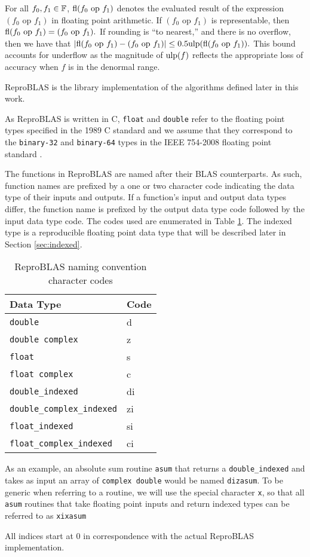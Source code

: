   For all $f_0, f_1 \in \mathbb{F}$, $\text{fl}(f_0 \text{ op } f_1)$ denotes the evaluated
  result of the expression $(f_0 \text{ op } f_1)$ in floating point
  arithmetic. If $(f_0 \text{ op } f_1)$ is representable, then
  \(
    \text{fl}(f_0 \text{ op } f_1) = (f_0 \text{ op } f_1).
  \)
  If rounding is ``to nearest,'' and there is no overflow, then we have that
  \(
    |\text{fl}(f_0 \text{ op } f_1) - (f_0 \text{ op } f_1)| \leq 0.5\text{ulp}(\text{fl}(f_0 \text{ op } f_1)).
  \)
  This bound accounts for underflow as the magnitude of $\text{ulp}(f)$ reflects the appropriate loss of accuracy when $f$ is in the denormal range.

  ReproBLAS is the library implementation of the algorithms defined later in this work.

  As ReproBLAS is written in C, \texttt{float} and \texttt{double} refer to the
  floating point types specified in the 1989 C standard \cite{c89} and we
  assume that they correspond to the \texttt{binary-32} and \texttt{binary-64}
  types in the IEEE 754-2008 floating point standard \cite{ieee754}.

  The functions in ReproBLAS are named after their BLAS counterparts.
  As such, function names are prefixed by a one or two character code indicating the data type of their inputs and outputs. If a function's input and output data types differ, the function name is prefixed by the output data type code followed by the input data type code.
  The codes used are enumerated in Table \ref{tbl:blas_naming_codes}. The indexed type is a reproducible floating point data type that will be described later in Section \ref{sec:indexed}.
  \begin{table}[!htbp]
    \caption{ReproBLAS naming convention character codes}
    \label{tbl:blas_naming_codes}
        \centering
        \begin{tabular}{ | l | l | } \hline
            Data Type & Code \\ \hline
            \texttt{double} & d \\ \hline
            \texttt{double complex} & z \\ \hline
            \texttt{float} & s \\ \hline
            \texttt{float complex} & c \\ \hline
            \texttt{double\_indexed} & di \\ \hline
            \texttt{double\_complex\_indexed} & zi \\ \hline
            \texttt{float\_indexed} & si \\ \hline
            \texttt{float\_complex\_indexed} & ci \\ \hline
        \end{tabular}
  \end{table}
  As an example, an absolute sum routine \texttt{asum} that returns a \texttt{double\_indexed} and takes as input an array of \texttt{complex double} would be named \texttt{dizasum}. To be generic when referring to a routine, we will use the special character \texttt{x}, so that all \texttt{asum} routines that take floating point inputs and return indexed types can be referred to as \texttt{xixasum}

  All indices start at $0$ in correspondence with the actual ReproBLAS implementation.

